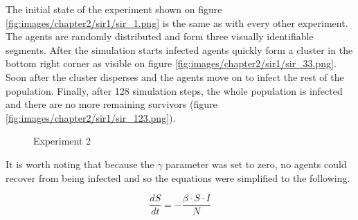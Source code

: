 The initial state of the experiment shown on figure \ref{fig:images/chapter2/sir1/sir_1.png} is the same as with every other experiment.
The agents are randomly distributed and form three visually identifiable segments.
After the simulation starts infected agents quickly form a cluster in the bottom right corner as visible on figure \ref{fig:images/chapter2/sir1/sir_33.png}.
Soon after the cluster disperses and the agents move on to infect the rest of the population.
Finally, after 128 simulation steps, the whole population is infected and there are no more remaining survivors (figure \ref{fig:images/chapter2/sir1/sir_123.png}).

\begin{figure}[H]
    \centering
    \hspace*{\fill}
    \hspace*{\fill}

    \caption{Experiment 2} \label{fig:experiment1}
\end{figure}

It is worth noting that because the $\gamma$ parameter was set to zero, no agents could recover from being infected and so the equations were simplified to the following.

\begin{equation} \label{eq:sir1_gamma0}
    \frac{{dS}}{{dt}} = -\frac{{\beta \cdot S \cdot I}}{{N}}
\end{equation}


